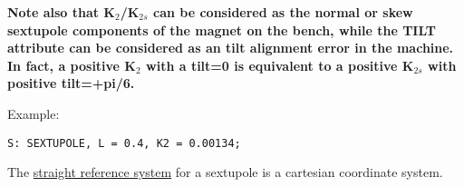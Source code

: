 \textbf{  Note also that K$_2$/K$_{2s}$ can be considered as the normal
  or skew sextupole components of the magnet on the bench, while the
  TILT attribute can be considered as an tilt alignment error in the
  machine. In fact, a positive K$_2$ with a tilt=0 is equivalent to a
  positive K$_{2s}$ with positive tilt=+pi/6.  } 

Example: 
\begin{verbatim}
S: SEXTUPOLE, L = 0.4, K2 = 0.00134;
\end{verbatim} 

The \href{local_system.html#straight}{straight reference system} for a
sextupole is a cartesian coordinate system.   

